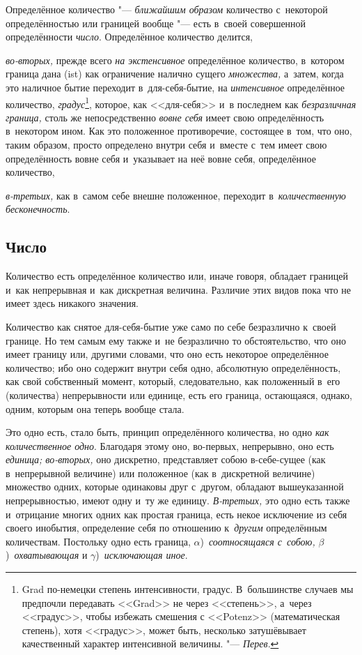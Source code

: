 Определённое количество "--- {\em ближайшим образом} количество с~некоторой
определённостью или границей вообще "--- есть в~своей совершенной
определённости {\em число}. Определённое количество делится,

{\em во-вторых,} прежде всего {\em на экстенсивное} определённое количество,
в~котором граница дана (ist) как ограничение налично сущего {\em множества,}
а~затем, когда это наличное бытие переходит в~для-себя-бытие, на
{\em интенсивное} определённое количество, {\em градус}\footnote{Grad
по-немецки степень интенсивности, градус. В~большинстве случаев мы предпочли
передавать <<Grad>> не через <<степень>>, а~через <<градус>>, чтобы избежать
смешения с <<Potenz>> (математическая степень), хотя <<градус>>, может быть,
несколько затушёвывает качественный характер интенсивной величины. "---
{\em Перев}.}, которое, как <<для-себя>> и~в последнем как {\em безразличная
граница,} столь же непосредственно {\em вовне себя} имеет свою
определённость в~некотором ином. Как это положенное противоречие, состоящее
в~том, что оно, таким образом, просто определено внутри себя и~вместе с~тем
имеет свою определённость вовне себя и~указывает на неё вовне себя, определённое
количество,

{\em в-третьих,} как в~самом себе внешне положенное, переходит
в~{\em количественную бесконечность}.

\subsection{Число}

Количество есть определённое количество или, иначе говоря, обладает границей
и~как непрерывная и~как дискретная величина. Различие этих видов пока что
не имеет здесь никакого значения.

Количество как снятое для-себя-бытие уже само по себе безразлично к~своей
границе. Но тем самым ему также и~не безразлично то обстоятельство, что оно
имеет границу или, другими словами, что оно есть некоторое определённое
количество; ибо оно содержит внутри себя одно, абсолютную определённость,
как свой собственный момент, который, следовательно, как положенный в~его
(количества) непрерывности или единице, есть его граница, остающаяся,
однако, одним, которым она теперь вообще стала.

Это одно есть, стало быть, принцип определённого количества, но одно
{\em как количественное одно}. Благодаря этому оно, во-первых, непрерывно,
оно есть {\em единица; во-вторых,} оно дискретно, представляет собою
в-себе-сущее (как в~непрерывной величине) или положенное (как в~дискретной
величине) множество одних, которые одинаковы друг с~другом, обладают
вышеуказанной непрерывностью, имеют одну и~ту же единицу. {\em В-третьих,}
это одно есть также и~отрицание многих одних как простая граница, есть некое
исключение из себя своего инобытия, определение себя по отношению
к~{\em другим} определённым количествам. Постольку одно есть граница,
$\alpha$)~{\em соотносящаяся с~собою,} $\beta$)~{\em охватывающая} и
$\gamma$)~{\em исключающая иное}.

